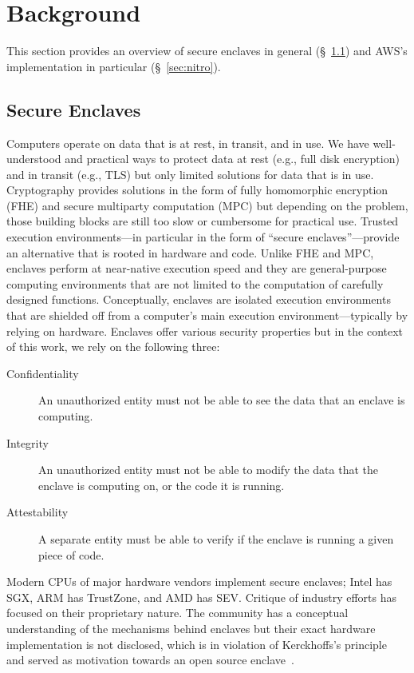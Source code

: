 \section{Background}
\label{sec:background}

This section provides an overview of secure enclaves in general (\S~\ref{sec:enclaves}) and AWS's implementation in particular (\S~\ref{sec:nitro}).

\subsection{Secure Enclaves}
\label{sec:enclaves}

Computers operate on data that is at rest, in transit, and in use.  We have well-understood and practical ways to protect data at rest (e.g., full disk encryption) and in transit (e.g., TLS) but only limited solutions for data that is in use.  Cryptography provides solutions in the form of fully homomorphic encryption (FHE) and secure multiparty computation (MPC) but depending on the problem, those building blocks are still too slow or cumbersome for practical use.  Trusted execution environments---in particular in the form of ``secure enclaves''---provide an alternative that is rooted in hardware and code.  Unlike FHE and MPC, enclaves perform at near-native execution speed and they are general-purpose computing environments that are not limited to the computation of carefully designed functions.  Conceptually, enclaves are isolated execution environments that are shielded off from a computer's main execution environment---typically by relying on hardware.  Enclaves offer various security properties but in the context of this work, we rely on the following three:

\begin{description}
    \item[Confidentiality] An unauthorized entity must not be able to see the data that an enclave is computing.
    \item[Integrity] An unauthorized entity must not be able to modify the data that the enclave is computing on, or the code it is running.
    \item[Attestability] A separate entity must be able to verify if the enclave is running a given piece of code.
\end{description}

Modern CPUs of major hardware vendors implement secure enclaves; Intel has SGX, ARM has TrustZone, and AMD has SEV. Critique of industry efforts has focused on their proprietary nature. The community has a conceptual understanding of the mechanisms behind enclaves but their exact hardware implementation is not disclosed, which is in violation of Kerckhoffs's principle and served as motivation towards an open source enclave~\cite{Lee20a}.

